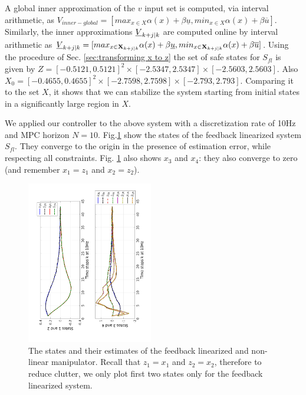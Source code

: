 
A global inner approximation of the $v$ input set is computed, via interval arithmetic, as $V_{inner-global} = [max_{x\in X}\alpha(x) + \beta \underline{u}, min_{x\in X}\alpha(x) + \beta \overline{u}]$. 
Similarly, the inner approximations $\underline{V}_{k+j|k}$ are computed online by interval arithmetic as $\underline{V}_{k+j|k} = [max_{x\in \mathbf{X}_{k+j|k}} \alpha(x) + \beta \underline{u},  min_{x\in \mathbf{X}_{k+j|k}}\alpha(x) + \beta \overline{u}]$. 
Using the procedure of Sec. \ref{sec:transforming x to z} the set of safe states for $S_{fl}$ is given by $Z = [-0.5121, 0.5121]^2 \times [-2.5347, 2.5347] \times [-2.5603, 2.5603]$. Also $X_0 = [-0.4655,0.4655]^2 \times [-2.7598,2.7598] \times [-2.793,2.793]$. Comparing it to the set $X$, it shows that we can stabilize the system starting from initial states in a significantly large region in $X$.

We applied our controller to the above system with a discretization rate of 10Hz and MPC horizon $N=10$.
Fig.\ref{fig:AllStates_manip} show the states of the feedback linearized system $S_{fl}$. 
They converge to the origin in the presence of estimation error, while respecting all constraints.
Fig. \ref{fig:AllStates_manip} also shows $x_3$ and $x_4$: they also converge to zero (and remember $x_1 = z_1$ and $x_2 = z_2$).

\begin{figure}
\includegraphics[angle=270,width=0.49\textwidth]{figs/AllStates_manip.pdf}
\caption{The states and their estimates of the feedback linearized and non-linear manipulator. Recall that $z_1 = x_1$ and $z_2=x_2$, therefore to reduce clutter, we only plot first two states only for the feedback linearized system.}
\label{fig:AllStates_manip}
\end{figure}

